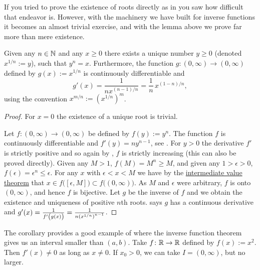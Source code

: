 If you tried to prove the existence of roots directly as in
 you saw
how difficult that endeavor is.  However, with the machinery we have built
for inverse functions it becomes
an almost trivial exercise, and with the lemma above we prove
far more than mere existence.

\begin{cor}
Given any $n \in {\mathbb{N}}$ and any $x \geq 0$ there exists a unique 
number $y \geq 0$ (denoted $x^{1/n} := y$), such that $y^n = x$.  Furthermore,
the function $g \colon (0,\infty) \to (0,\infty)$ defined by
$g(x) := x^{1/n}$ is continuously differentiable and
\begin{equation*}
g'(x) = \frac{1}{nx^{(n-1)/n}} = \frac{1}{n} \, x^{(1-n)/n} ,
\end{equation*}
using the convention $x^{m/n} := {(x^{1/n})}^{m}$.
\end{cor}

\begin{proof}
For $x=0$ the existence of a unique root is trivial.

Let $f \colon (0,\infty) \to (0,\infty)$ be defined by $f(y) := y^n$.
The function $f$ is continuously differentiable
and $f'(y) = ny^{n-1}$, see .  For $y > 0$ the derivative $f'$ is strictly positive
and so again by , $f$ is strictly
increasing (this can also be proved directly).
Given any $M > 1$, $f(M) = M^n \geq M$, and given any $1 > \epsilon > 0$,
$f(\epsilon) = \epsilon^n \leq \epsilon$.  For any $x$ with $\epsilon < x <
M$ we have by the
\hyperref[IVT:thm]{intermediate value theorem} that $x \in
f\bigl( [\epsilon,M] \bigr) \subset
f\bigl( (0,\infty) \bigr)$.  As $M$ and $\epsilon$ were arbitrary, $f$ is onto
$(0,\infty)$, and hence $f$ is bijective.
Let $g$ be the inverse of $f$ and we obtain
the existence and uniqueness of positive
$n$th roots.   says $g$ has a continuous
derivative and $g'(x) =
\frac{1}{f'\left(\vphantom{1^1_1}g(x)\right)} = \frac{1}{n {(x^{1/n})}^{n-1}}$.
\end{proof}

\begin{example}
The corollary provides a good example of where the inverse function theorem
gives us an interval smaller than $(a,b)$.  Take $f \colon {\mathbb{R}} \to {\mathbb{R}}$
defined by $f(x) := x^2$.  Then $f'(x) \not= 0$
as long as $x \not= 0$.  If $x_0 > 0$, we can take $I=(0,\infty)$, but
no larger.
\end{example}

